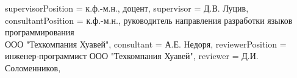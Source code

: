 \documentclass[14pt]{matmex-diploma-custom}
\begin{document}
{    %
    supervisorPosition = {к.ф.-м.н., доцент}, %
    supervisor         = {Д.В. Луцив},  
    consultantPosition = {к.ф.-м.н., руководитель направления разработки
    языков программирования\\ООО "Техкомпания Хуавей"},
    consultant         = {А.Е. Недоря},
    reviewerPosition   = {инженер-программист ООО "Техкомпания Хуавей"},
    reviewer           = {Д.И. Соломенников},
}
\end{document}
